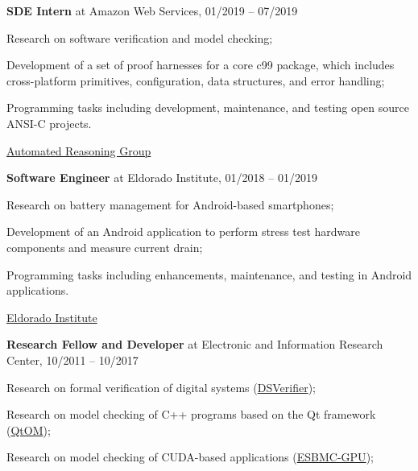 \documentclass[letterpaper]{article}
\renewenvironment{itemize}{
  \begin{list}{}{
    \setlength{\leftmargin}{1.5em}
  }
}{
  \end{list}
}
\begin{document}
    \begin{enumerate}
       \item{{\bf SDE Intern} at Amazon Web Services, 01/2019 -- 07/2019}
      \begin{itemize}
        \item{\textendash} {Research on software verification and model checking;}
        \item{\textendash} {Development of a set of proof harnesses for a core c99 package, which includes cross-platform primitives, configuration, data structures, and error handling;}
        \item{\textendash} {Programming tasks including development, maintenance, and testing open source ANSI-C projects.}
        \item{\textendash} \href{https://aws.amazon.com/security/provable-security/?sc_channel=EL&sc_campaign=Promo_2018_vid&sc_medium=YouTube&sc_content=video3507&sc_detail=CAREERS&sc_country=US}{Automated Reasoning Group}
      \end{itemize}
         \item{{\bf Software Engineer} at Eldorado Institute, 01/2018 -- 01/2019}
      \begin{itemize}
        \item{\textendash} {Research on battery management for Android-based smartphones;}
        \item{\textendash} {Development of an Android application to perform stress test hardware components and measure current drain;}
        \item{\textendash} {Programming tasks including enhancements, maintenance, and testing in Android applications.}
        \item{\textendash} \href{http://eldorado.org.br/}{Eldorado Institute}
      \end{itemize}
     \item{{\bf Research Fellow and Developer} at Electronic and Information Research Center, 10/2011 -- 10/2017}
      \begin{itemize}
        \item{\textendash} {Research on formal verification of digital systems (\href{http://www.dsverifier.org/}{DSVerifier});}
        \item{\textendash} {Research on model checking of C++ programs based on the Qt framework (\href{http://www.esbmc/qtom/}{QtOM});}
        \item{\textendash} {Research on model checking of CUDA-based applications (\href{http://www.esbmc/gpu/}{ESBMC-GPU});}

\end{itemize}
\end{enumerate}
\end{document}
